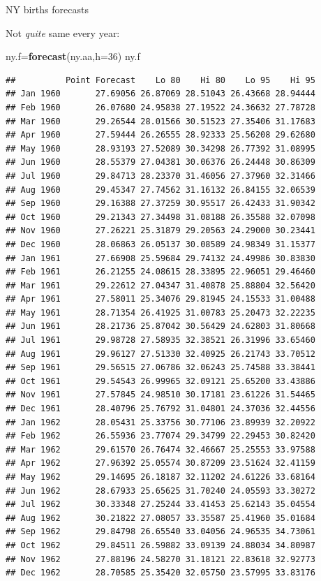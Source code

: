 \documentclass[
  ignorenonframetext,
]{beamer}
\newenvironment{Shaded}{\begin{snugshade}}{\end{snugshade}}
\newcommand{\DataTypeTok}[1]{\textcolor[rgb]{0.13,0.29,0.53}{#1}}
\newcommand{\DecValTok}[1]{\textcolor[rgb]{0.00,0.00,0.81}{#1}}
\newcommand{\KeywordTok}[1]{\textcolor[rgb]{0.13,0.29,0.53}{\textbf{#1}}}
\newcommand{\NormalTok}[1]{#1}
\begin{document}
\begin{frame}[fragile]{NY births forecasts}
\protect\hypertarget{ny-births-forecasts}{}

Not \emph{quite} same every year:

\tiny

\begin{Shaded}
\begin{Highlighting}[]
\NormalTok{ny.f=}\KeywordTok{forecast}\NormalTok{(ny.aa,}\DataTypeTok{h=}\DecValTok{36}\NormalTok{)}
\NormalTok{ny.f}
\end{Highlighting}
\end{Shaded}

\begin{verbatim}
##          Point Forecast    Lo 80    Hi 80    Lo 95    Hi 95
## Jan 1960       27.69056 26.87069 28.51043 26.43668 28.94444
## Feb 1960       26.07680 24.95838 27.19522 24.36632 27.78728
## Mar 1960       29.26544 28.01566 30.51523 27.35406 31.17683
## Apr 1960       27.59444 26.26555 28.92333 25.56208 29.62680
## May 1960       28.93193 27.52089 30.34298 26.77392 31.08995
## Jun 1960       28.55379 27.04381 30.06376 26.24448 30.86309
## Jul 1960       29.84713 28.23370 31.46056 27.37960 32.31466
## Aug 1960       29.45347 27.74562 31.16132 26.84155 32.06539
## Sep 1960       29.16388 27.37259 30.95517 26.42433 31.90342
## Oct 1960       29.21343 27.34498 31.08188 26.35588 32.07098
## Nov 1960       27.26221 25.31879 29.20563 24.29000 30.23441
## Dec 1960       28.06863 26.05137 30.08589 24.98349 31.15377
## Jan 1961       27.66908 25.59684 29.74132 24.49986 30.83830
## Feb 1961       26.21255 24.08615 28.33895 22.96051 29.46460
## Mar 1961       29.22612 27.04347 31.40878 25.88804 32.56420
## Apr 1961       27.58011 25.34076 29.81945 24.15533 31.00488
## May 1961       28.71354 26.41925 31.00783 25.20473 32.22235
## Jun 1961       28.21736 25.87042 30.56429 24.62803 31.80668
## Jul 1961       29.98728 27.58935 32.38521 26.31996 33.65460
## Aug 1961       29.96127 27.51330 32.40925 26.21743 33.70512
## Sep 1961       29.56515 27.06786 32.06243 25.74588 33.38441
## Oct 1961       29.54543 26.99965 32.09121 25.65200 33.43886
## Nov 1961       27.57845 24.98510 30.17181 23.61226 31.54465
## Dec 1961       28.40796 25.76792 31.04801 24.37036 32.44556
## Jan 1962       28.05431 25.33756 30.77106 23.89939 32.20922
## Feb 1962       26.55936 23.77074 29.34799 22.29453 30.82420
## Mar 1962       29.61570 26.76474 32.46667 25.25553 33.97588
## Apr 1962       27.96392 25.05574 30.87209 23.51624 32.41159
## May 1962       29.14695 26.18187 32.11202 24.61226 33.68164
## Jun 1962       28.67933 25.65625 31.70240 24.05593 33.30272
## Jul 1962       30.33348 27.25244 33.41453 25.62143 35.04554
## Aug 1962       30.21822 27.08057 33.35587 25.41960 35.01684
## Sep 1962       29.84798 26.65540 33.04056 24.96535 34.73061
## Oct 1962       29.84511 26.59882 33.09139 24.88034 34.80987
## Nov 1962       27.88196 24.58270 31.18121 22.83618 32.92773
## Dec 1962       28.70585 25.35420 32.05750 23.57995 33.83176
\end{verbatim}

\normalsize

\end{frame}
\end{document}
